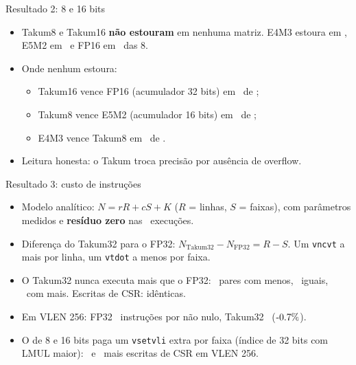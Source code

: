 \documentclass[aspectratio=169,10pt]{beamer}
\begin{document}
\begin{frame}{Resultado 2: 8 e 16 bits}
	\begin{itemize}
		\item Takum8 e Takum16 \textbf{não estouram} em nenhuma matriz.
		      E4M3 estoura em \NFEquatrom, E5M2 em \NFCincodois\ e FP16 em
		      \NFDez\ das 8.
		\item Onde nenhum estoura:
		\begin{itemize}
			\item Takum16 vence FP16 (acumulador 32 bits) em
			      \ParDezFPTakumVence\ de \ParDezFPAmbos;
			\item Takum8 vence E5M2 (acumulador 16 bits) em
			      \ParOitoCincodoisTakumVence\ de \ParOitoCincodoisAmbos;
			\item E4M3 vence Takum8 em \ParOitoEquatromOutroVence\ de
			      \ParOitoEquatromAmbos.
		\end{itemize}
		\item Leitura honesta: o Takum troca precisão por ausência de overflow.
	\end{itemize}
\end{frame}

\begin{frame}{Resultado 3: custo de instruções}
	\begin{itemize}
		\item Modelo analítico: $N = rR + cS + K$ ($R$ = linhas, $S$ = faixas),
		      com parâmetros medidos e \textbf{resíduo zero} nas \ModExec\
		      execuções.
		\item Diferença do Takum32 para o FP32: $N_{\text{Takum32}} -
		      N_{\text{FP32}} = R - S$. Um \texttt{vncvt} a mais por linha,
		      um \texttt{vtdot} a menos por faixa.
		\item O Takum32 nunca executa mais que o FP32:
		      \InsnMenorTrinta\ pares com menos, \InsnIgualTrinta\ iguais,
		      \InsnMaiorTrinta\ com mais. Escritas de CSR: idênticas.
		\item Em VLEN 256: FP32 \InsnNnzFPDuzentos\ instruções por não nulo,
		      Takum32 \InsnNnzTrintaDuzentos\ ($\RelInsnTrintaDuzentos$).
		\item O de 8 e 16 bits paga um \texttt{vsetvli} extra por faixa
		      (índice de 32 bits com LMUL maior): \RelCsrOitoDuzentos\ e
		      \RelCsrDezDuzentos\ mais escritas de CSR em VLEN 256.
	\end{itemize}
\end{frame}
\end{document}
